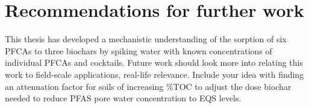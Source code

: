 \chapter{Recommendations for further work}\label{chap:furtherwork}

This thesis has developed a mechanistic understanding of the sorption of six PFCAs to three biochars by spiking water with known concentrations of individual PFCAs and cocktails. Future work should look more into relating this work to field-scale applications, real-life relevance. Include your idea with finding an attenuation factor for soils of increasing \%TOC to adjust the dose biochar needed to reduce PFAS pore water concentration to EQS levels. 
